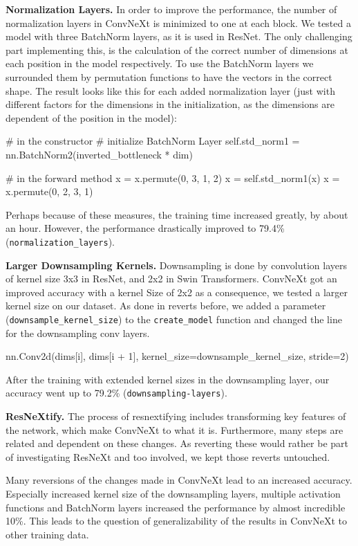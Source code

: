 \documentclass{article}
\begin{document}
\textbf{Normalization Layers.}
In order to improve the performance, the number of normalization layers in ConvNeXt is minimized to one at each block.
We tested a model with three BatchNorm layers, as it is used in ResNet.
The only challenging part implementing this, is the calculation of the correct number of dimensions at each position in the model respectively.
To use the BatchNorm layers we surrounded them by permutation functions to have the vectors in the correct shape.
The result looks like this for each added normalization layer (just with different factors for the dimensions in the initialization, as the dimensions are dependent of the position in the model):
\begin{python}
# in the constructor
# initialize BatchNorm Layer
self.std_norm1 = nn.BatchNorm2(inverted_bottleneck * dim)

# in the forward method
x = x.permute(0, 3, 1, 2)
x = self.std_norm1(x)
x = x.permute(0, 2, 3, 1)
\end{python}
Perhaps because of these measures, the training time increased greatly, by about an hour.
However, the performance drastically improved to 79.4\% (\texttt{normalization\_layers}).

\textbf{Larger Downsampling Kernels.}
Downsampling is done by convolution layers of kernel size 3x3 in ResNet, and 2x2 in Swin Transformers.
ConvNeXt got an improved accuracy with a kernel Size of 2x2 as a consequence, we tested a larger kernel size on our dataset.
As done in reverts before, we added a parameter (\texttt{downsample\_kernel\_size}) to the \texttt{create\_model} function and changed the line for the downsampling conv layers.
\begin{python}
nn.Conv2d(dims[i], dims[i + 1],
kernel_size=downsample_kernel_size, stride=2)
\end{python}
After the training with extended kernel sizes in the downsampling layer, our accuracy went up to 79.2\% (\texttt{downsampling-layers}).

\textbf{ResNeXtify.}
The process of resnextifying includes transforming key features of the network, which make ConvNeXt to what it is.
Furthermore, many steps are related and dependent on these changes.
As reverting these would rather be part of investigating ResNeXt and too involved, we kept those reverts untouched.

Many reversions of the changes made in ConvNeXt lead to an increased accuracy.
Especially increased kernel size of the downsampling layers, multiple activation functions and BatchNorm layers increased the performance by almost incredible 10\%.
This leads to the question of generalizability of the results in ConvNeXt to other training data.
\end{document}
